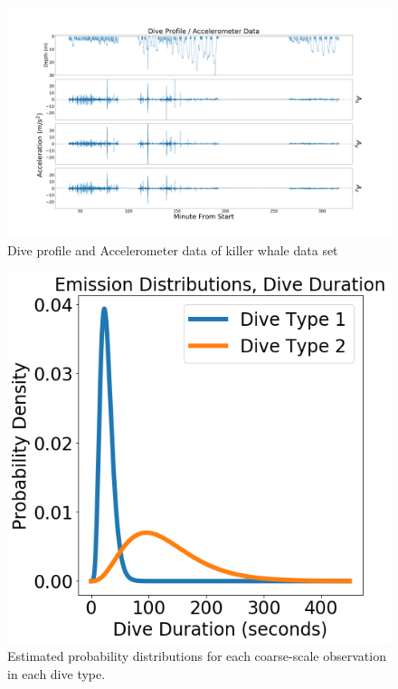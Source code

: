 
\begin{figure}[ht]
	\centering
	\includegraphics[width=5in]{../Plots/raw_data.png}
	\caption{Dive profile and Accelerometer data of killer whale data set}
	\label{fig:data}
\end{figure}

\begin{figure}[ht]
	\centering
	\includegraphics[width=5in]{../Plots/coarse-emissions.png}
	\caption{Estimated probability distributions for each coarse-scale observation in each dive type.}
	\label{fig:coarse_emis}
\end{figure}

